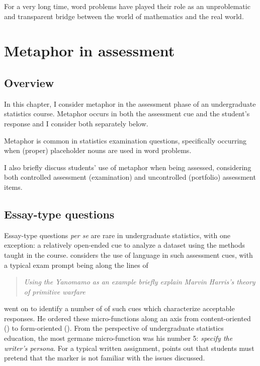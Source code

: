 \begin{singlespace}
\begin{savequote}[105mm]
For a very long time, word problems have played
  their role as an unproblematic and transparent bridge between the
  world of mathematics and the real world.
\end{savequote}
\end{singlespace}

\chapter{Metaphor in assessment}
\label{chapter6}

\section{Overview}

In this chapter, I consider metaphor in the assessment phase of an
undergraduate statistics course.  Metaphor occurs in both the
assessment cue and the student's response and I consider both
separately below.

Metaphor is common in statistics examination questions, specifically
occurring when (proper) placeholder nouns are used in word problems.

I also briefly discuss students' use of metaphor when being assessed,
considering both controlled assessment (examination) and uncontrolled
(portfolio) assessment items.

\section{Essay-type questions}

Essay-type questions {\em per se} are rare in undergraduate
statistics, with one exception: a relatively open-ended cue to analyze
a dataset using the methods taught in the course.  
considers the use of language in such assessment cues, with a typical
exam prompt being along the lines of

\begin{quote}
  \emph{Using the Yanomamo as an example briefly explain Marvin
    Harris's theory of primitive warfare}
\end{quote}
  
\noindent\citeauthor{horowitz1986} went on to identify a number of
 of such cues which characterize acceptable
responses.  He ordered these micro-functions along an axis from
content-oriented () to form-oriented
().  From the perspective of
undergraduate statistics education, the most germane micro-function
was his number 5: \emph{specify the writer's persona}.  For a typical
written assignment,  points out that students
must pretend that the marker is not familiar with the issues
discussed.

